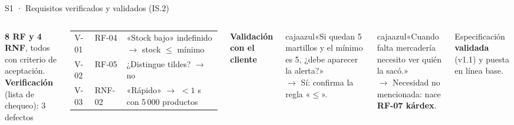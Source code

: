 \documentclass[aspectratio=169,11pt]{beamer}
\newcommand{\caja}[3]{\begin{beamercolorbox}[wd=\dimexpr\linewidth-12pt\relax,sep=6pt,rounded=true]{#1}#3\end{beamercolorbox}}
\begin{document}
\begin{frame}{S1 · Requisitos verificados y validados (IS.2)}
\begin{columns}[T,onlytextwidth]
\textbf{8 RF y 4 RNF}, todos con criterio de aceptación.\\[0.15cm]
\textbf{Verificación} (lista de chequeo): 3 defectos
\scriptsize
\begin{tabularx}{\linewidth}{@{}l l L@{}}
\toprule
V-01 & RF-04 & «Stock bajo» indefinido $\rightarrow$ stock $\leq$ mínimo \\
V-02 & RF-05 & ¿Distingue tildes? $\rightarrow$ no \\
V-03 & RNF-02 & «Rápido» $\rightarrow$ $< 1$ s con 5\,000 productos \\
\bottomrule
\end{tabularx}
\textbf{Validación con el cliente}\\[0.1cm]
\caja{cajaazul}{}{\small «Si quedan 5 martillos y el mínimo es 5, ¿debe aparecer la alerta?»\\[0.1cm]
\footnotesize\color{gristexto}$\rightarrow$ Sí: confirma la regla «$\leq$».}
\vspace{0.15cm}
\caja{cajaazul}{}{\small «Cuando falta mercadería necesito ver quién la sacó.»\\[0.1cm]
\footnotesize\color{gristexto}$\rightarrow$ Necesidad no mencionada: nace \textbf{RF-07 kárdex}.}
\vspace{0.1cm}
{\footnotesize Especificación \textbf{validada} (v1.1) y puesta en línea base.}
\end{columns}
\end{frame}
\end{document}

